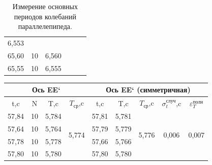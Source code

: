 \begin{table}[h!]
\begin{tabular}{|cccccc|}
  \multicolumn{1}{c|}{6,553} &
  \multicolumn{1}{c|}{} &
  \multicolumn{1}{c|}{} &
   \\ \cline{1-3}
\multicolumn{1}{|c|}{65,60} &
  \multicolumn{1}{c|}{10} &
  \multicolumn{1}{c|}{6,560} &
  \multicolumn{1}{c|}{} &
  \multicolumn{1}{c|}{} &
   \\ \cline{1-3}
\multicolumn{1}{|c|}{65,55} &
  \multicolumn{1}{c|}{10} &
  \multicolumn{1}{c|}{6,555} &
  \multicolumn{1}{c|}{} &
  \multicolumn{1}{c|}{} &
   \\ \hline
\end{tabular}
\caption{Измерение основных периодов колебаний параллелепипеда.}
\label{tabl1}
\end{table}

\newpage

\begin{table}[h!]
\centering
\begin{tabular}{|cccc|ccccc|}
\hline
\multicolumn{4}{|c|}{Ось EE`} &
  \multicolumn{5}{c|}{Ось EE` (симметричная)} \\ \hline
\multicolumn{1}{|c|}{t,c} &
  \multicolumn{1}{c|}{N} &
  \multicolumn{1}{c|}{T,c} &
  $T_\text{ср}$,c &
  \multicolumn{1}{c|}{t,c} &
  \multicolumn{1}{c|}{T,c} &
  \multicolumn{1}{c|}{$T_\text{ср}$,c} &
  \multicolumn{1}{c|}{$\sigma_t^\text{случ}$,c} &
  $\varepsilon_T^\text{полн}$ \\ \hline
\multicolumn{1}{|c|}{57,84} &
  \multicolumn{1}{c|}{10} &
  \multicolumn{1}{c|}{5,784} &
  \multirow{5}{*}{5,774} &
  \multicolumn{1}{c|}{57,81} &
  \multicolumn{1}{c|}{5,781} &
  \multicolumn{1}{c|}{\multirow{5}{*}{5,776}} &
  \multicolumn{1}{c|}{\multirow{5}{*}{0,006}} &
  \multirow{5}{*}{0,007} \\ \cline{1-3} \cline{5-6}
\multicolumn{1}{|c|}{57,64} &
  \multicolumn{1}{c|}{10} &
  \multicolumn{1}{c|}{5,764} &
   &
  \multicolumn{1}{c|}{57,79} &
  \multicolumn{1}{c|}{5,779} &
  \multicolumn{1}{c|}{} &
  \multicolumn{1}{c|}{} &
   \\ \cline{1-3} \cline{5-6}
\multicolumn{1}{|c|}{57,78} &
  \multicolumn{1}{c|}{10} &
  \multicolumn{1}{c|}{5,778} &
   &
  \multicolumn{1}{c|}{57,66} &
  \multicolumn{1}{c|}{5,766} &
  \multicolumn{1}{c|}{} &
  \multicolumn{1}{c|}{} &
   \\ \cline{1-3} \cline{5-6}
\multicolumn{1}{|c|}{57,80} &
  \multicolumn{1}{c|}{10} &
  \multicolumn{1}{c|}{5,780} &
   &
  \multicolumn{1}{c|}{57,80} &
  \multicolumn{1}{c|}{5,780} &
  \multicolumn{1}{c|}{} &
  \multicolumn{1}{c|}{} &
   \\ \cline{1-3} \cline{5-6}

\end{tabular}
\end{table}

